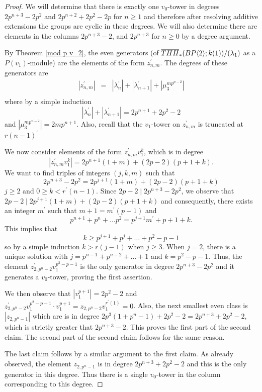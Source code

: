 \begin{proof}
We will determine that there is exactly one $v_0$-tower in degrees $2p^{n+3}-2p^2$ and $2p^{n+2}+2p^2-2p$ for $n\ge 1$ and therefore after resolving additive extensions the groups are cyclic in these degrees. We will also determine there are elements in the columns $2p^{n+3}-2$, and $2p^{n+3}$ for $n\ge 0$ by a degree argument. 

By Theorem \ref{mod p v_2}, the even generators (of $\overline{THH}_*(BP\langle 2 \rangle;k(1))/(\lambda_1)$ as a $P(v_1)$-module) are the elements of the form $z_{n,m}^{\prime}$. 
The degrees of these generators are
\[ 
\begin{array}{ccc}
|z_{n,m}^{\prime}|&=&|\lambda_n^{\prime}|+|\lambda_{n+1}^{\prime}|+|\mu_3^{mp^{n-2}}|\\
\end{array}
\]
where by a simple induction 
\[ |\lambda_n^{\prime}|+|\lambda_{n+1}^{\prime}|=2p^{n+1}+2p^2-2\]
and $|\mu_3^{mp^{n-2}}|=2mp^{n+1}$. Also, recall that the $v_1$-tower on $z_{n,m}^{\prime}$ is truncated at $r(n-1)^{\prime}$

We now consider elements of the form $z_{n,m}^{\prime}v_1^k$, which is in degree 
\[|z_{n,m}^{\prime}v_1^k|=2p^{n+1}(1+m)+(2p-2)(p+1+k).\]
We want to find triples of integers $(j,k,m)$ such that 
\[ 2p^{n+3}-2p^2=2p^{j+1}(1+m)+(2p-2)(p+1+k)\]
$j\ge 2$ and $0\ge k<r^{\prime}(n-1)$. Since $2p-2 \mid 2p^{n+3}-2p^2$, we observe that $2p-2 \mid 2p^{j+1}(1+m)+(2p-2)(p+1+k)$ and consequently, there exists an integer $m^{\prime}$ such that $m+1=m^{\prime}(p-1)$ and 
\[p^{n+1}+p^n+\ldots p^2= p^{j+1}m^{\prime}+p+1+k.\]
This implies that 
\[ k \ge p^{j+1}+p^j+\ldots +p^2-p-1 \]
so by a simple induction $k>r(j-1)$ when $j\ge 3$. When $j=2$, there is a unique solution with $j=p^{n-1}+p^{n-2}+\ldots +1$ and $k=p^2-p-1$. Thus, the element $z_{2,p^n-2}^{\prime}v_1^{p^2-p-1}$ is the only generator in degree $2p^{n+3}-2p^2$ and it generates a $v_0$-tower, proving the first assertion. 

We then observe that $|v_1^{p+1}|=2p^2-2$ and $z_{2,p^n-2}^{\prime}v_1^{p^2-p-1}\cdot v_1^{p+1}=z_{2,p^n-2}v_1^{r^{\prime}(1)}=0$. Also, the next smallest even class is $|z_{2,p^n-1}|$ which are is in degree
$2p^3(1+p^n-1)+2p^2-2=2p^{n+3}+2p^2-2$, which is strictly greater that $2p^{n+3}-2$. This proves the first part of the second claim. The second part of the second claim follows for the same reason. 

The last claim follows by a similar argument to the first claim. As already observed, the element $z_{2,p^n-1}$ is in degree $2p^{n+3}+2p^2-2$ and this is the only generator in this degree. Thus there is a single $v_0$-tower in the column corresponding to this degree. 
\end{proof}


